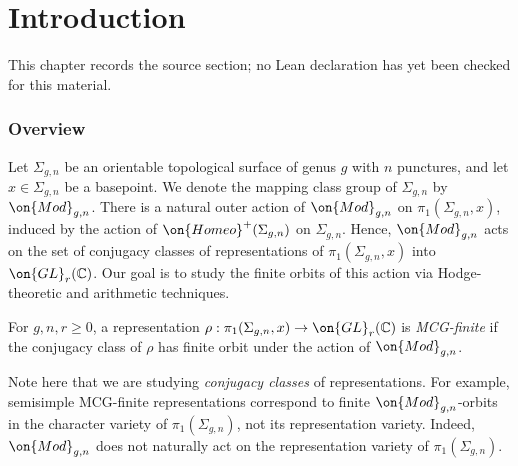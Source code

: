 \chapter{Introduction}
\label{canonical-representations-surface-groups-chapter-01}

\begin{remark}
\label{canonical-representations-surface-groups-chapter-01-source}
This chapter records the source section; no Lean declaration has yet been checked for this material.
\notready
\end{remark}

\label{section:introduction}
\subsection{Overview}
\label{subsection:overview}
Let $\Sigma_{g,n}$ be an orientable topological surface of genus $g$ with $n$ punctures, and let $x\in\Sigma_{g,n}$ be a basepoint.
We denote the mapping class group of $\Sigma_{g,n}$ by $\on{Mod}_{g,n}$.
There is a natural outer action of $\on{Mod}_{g,n}$ on $\pi_1(\Sigma_{g,n},x)$, induced by the action of $\on{Homeo}^+(\Sigma_{g,n})$ on $\Sigma_{g,n}$.
Hence, $\on{Mod}_{g,n}$ acts on the set of conjugacy classes of
representations of $\pi_1(\Sigma_{g,n},x)$ into $\on{GL}_r(\mathbb{C})$. Our goal is to study the finite orbits of this action
via Hodge-theoretic and arithmetic techniques.

\begin{definition}
\notready
	\label{definition:mcg-finite}
	For $g,n,r \geq 0$,
	a representation $\rho: \pi_1(\Sigma_{g,n},x) \to \on{GL}_r(\mathbb C)$
	is {\em MCG-finite} if the conjugacy class of $\rho$ has finite orbit under the action of
	$\on{Mod}_{g,n}$.
\end{definition}
Note here that we are studying \emph{conjugacy classes} of representations. For
example, semisimple MCG-finite representations correspond to finite
$\on{Mod}_{g,n}$-orbits in the character variety of $\pi_1(\Sigma_{g,n})$, not
its representation variety. Indeed, $\on{Mod}_{g,n}$ does not naturally act on
the representation variety of $\pi_1(\Sigma_{g,n})$.

